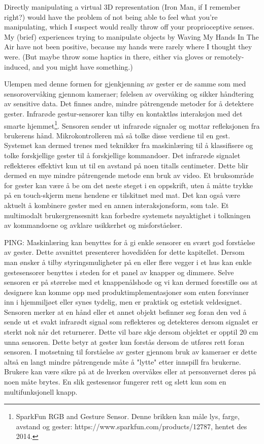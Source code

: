 Directly manipulating a virtual 3D representation (Iron Man, if I remember right?) would have the problem of not being able to feel what you're manipulating, which I suspect would really throw off your proprioceptive senses. My (brief) experiences trying to manipulate objects by Waving My Hands In The Air have not been positive, because my hands were rarely where I thought they were. (But maybe throw some haptics in there, either via gloves or remotely-induced, and you might have something.)

Ulempen med denne formen for gjenkjenning av gester er de samme som med sensorovervåking gjennom kameraer; følelsen av overvåking og sikker håndtering av sensitive data. Det finnes andre, mindre påtrengende metoder for å detektere gester. Infrarøde gestur-sensorer kan tilby en kontaktløs interaksjon med det smarte hjemmet\footnote{SparkFun RGB and Gesture Sensor. Denne brikken kan måle lys, farge, avstand og gester: https://www.sparkfun.com/products/12787, hentet des 2014.}. Sensoren sender ut infrarøde signaler og mottar refleksjonen fra brukerens hånd. Mikrokontrolleren må så tolke disse verdiene til en gest. Systemet kan dermed trenes med teknikker fra maskinlæring til å klassifisere og tolke forskjellige gester til å forskjellige kommandoer. Det infrarøde signalet reflekteres effektivt kun ut til en avstand på noen titalls centimeter. Dette blir dermed en mye mindre påtrengende metode enn bruk av video. Et bruksområde for gester kan være å be om det neste steget i en oppskrift, uten å måtte trykke på en touch-skjerm mens hendene er tilskitnet med mat. Det kan også være aktuelt å kombinere gester med en annen interaksjonsform, som tale. Et multimodalt brukergrensesnitt kan forbedre systemets nøyaktighet i tolkningen av kommandoene og avklare usikkerhet og misforståelser.

{\color{red}PING: Maskinlæring kan benyttes for å gi enkle sensorer en svært god forståelse av gester.}
Dette avsnittet presenterer hovedidéen for dette kapitellet. 
Dersom man ønsker å tilby styringsmuligheter på en eller flere vegger i et hus kan enkle gestesensorer benyttes i steden for et panel av knapper og dimmere. Selve sensoren er på størrelse med et knappenålshode og vi kan dermed forestille oss at designere kan komme opp med produktimplementasjoner som enten forsvinner inn i hjemmiljøet eller synes tydelig, men er praktisk og estetisk veldesignet. Sensoren merker at en hånd eller et annet objekt befinner seg foran den ved å sende ut et svakt infrarødt signal som reflekteres og detekteres dersom signalet er sterkt nok når det returnerer. Dette vil bare skje dersom objektet er opptil 20 cm unna sensoren. Dette betyr at gester kun forstås dersom de utføres rett foran sensoren. I motsetning til forståelse av gester gjennom bruk av kameraer er dette altså en langt mindre påtrengende måte å "lytte" etter innspill fra brukerne. Brukere kan være sikre på at de hverken overvåkes eller at personvernet deres på noen måte brytes. En slik gestesensor fungerer rett og slett kun som en multifunksjonell knapp.


